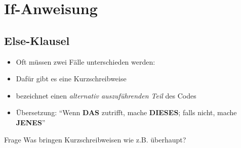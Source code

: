



\section{If-Anweisung}
\subsection{Else-Klausel}
\maketitle


\begin{frame}
	\slidehead
	\begin{itemize}
		\item Oft müssen zwei Fälle unterschieden werden:
		\vspace{0.58cm}
		\item Dafür gibt es eine Kurzschreibweise
	\end{itemize}
\end{frame}

\begin{frame}
	\slidehead

	\begin{itemize}
		\item {} bezeichnet einen \textit{alternativ auszuführenden Teil} des Codes
		\item Übersetzung: "`Wenn \textbf{DAS} zutrifft, mache \textbf{DIESES}; falls nicht, mache \textbf{JENES}"'
	\end{itemize}

	\begin{block}{Frage}
		Was bringen Kurzschreibweisen wie z.B.  überhaupt?
	\end{block}
\end{frame}

